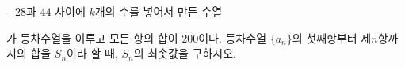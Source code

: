 $-28$과 $44$ 사이에 $k$개의 수를 넣어서 만든 수열 \par\smallskip{}\par\smallskip\noindent 가 등차수열을 이루고 모든 항의 합이 $200$이다. 등차수열 $\{a_n\}$의 첫째항부터 제$n$항까지의 합을 $S_n$이라 할 때, $S_n$의 최솟값을 구하시오.
